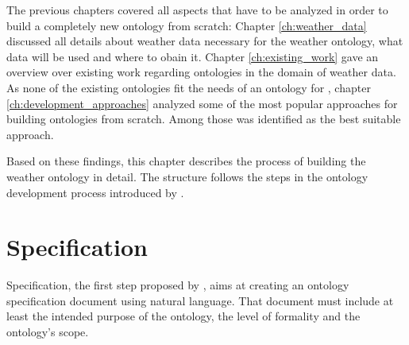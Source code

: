 




The previous chapters covered all aspects that have to be analyzed in order to build a completely new ontology from scratch: Chapter \ref{ch:weather_data} discussed all details about weather data necessary for the \thinkhome weather ontology, what data will be used and where to obain it. Chapter \ref{ch:existing_work} gave an overview over existing work regarding ontologies in the domain of weather data. As none of the existing ontologies fit the needs of an ontology for \thinkhome, chapter  \ref{ch:development_approaches} analyzed some of the most popular approaches for building ontologies from scratch. Among those \methontology was identified as the best suitable approach. %

Based on these findings, this chapter describes the process of building the \thinkhome weather ontology in detail. The structure follows the steps in the ontology development process introduced by \methontology.

\section{Specification}

Specification, the first step proposed by \methontology, aims at creating an ontology specification document using natural language. That document must include at least the intended purpose of the ontology, the level of 
formality and the ontology's scope.

